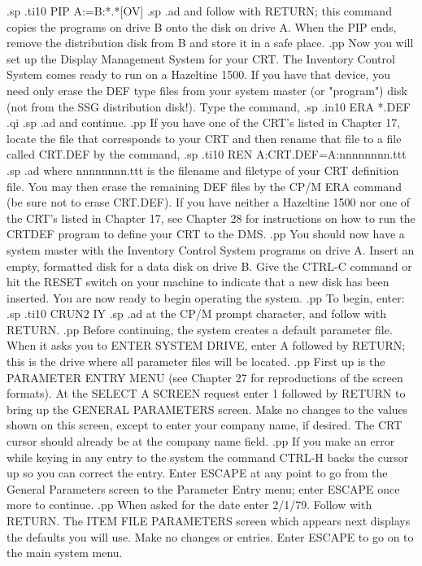 .sp
.ti10
PIP A:=B:*.*[OV]
.sp
.ad
and follow with RETURN; this command copies the programs on drive B onto
the disk on drive A.  When the PIP ends, remove the distribution disk
from B and store it in a safe place.
.pp
Now you will set up the Display Management System for your CRT. The
Inventory Control System comes ready to run on a Hazeltine 1500. If you
have that device, you need only erase the DEF type files from your system
master (or "program") disk (not from the SSG distribution disk!). Type
the command,
.sp
.in10
ERA *.DEF
.qi
.sp
.ad
and continue.
.pp
If you have one of the CRT's
listed in Chapter 17, locate the file that corresponds to your CRT and
then rename that file to a file called CRT.DEF by the command,
.sp
.ti10
REN A:CRT.DEF=A:nnnnnnnn.ttt
.sp
.ad
where nnnnnnnn.ttt is the filename and filetype of your CRT definition file.
You may then erase the remaining DEF files by the CP/M ERA command (be
sure not to erase CRT.DEF).  If you have neither a Hazeltine 1500 nor one of
the CRT's listed in Chapter 17, see Chapter 28 for instructions on how
to run the CRTDEF program to define your CRT to the DMS.
.pp
You should now have a system master with the Inventory Control System
programs on
drive A.  Insert an empty, formatted disk for a data disk on drive B.
Give the CTRL-C command or hit the RESET switch on your machine to indicate
that a new disk has been inserted.  You are now ready to begin operating
the system.
.pp
To begin, enter:
.sp
.ti10
CRUN2 IY
.sp
.ad
at the CP/M prompt character, and follow with RETURN.
.pp
Before continuing, the system creates a default parameter file.  When it
asks you to ENTER SYSTEM DRIVE, enter A followed by RETURN; this is the
drive where all parameter files will be located.
.pp
First up is the PARAMETER ENTRY MENU (see Chapter 27 for reproductions
of the screen formats).  At the SELECT A SCREEN request enter 1 followed
by RETURN to bring up the GENERAL PARAMETERS screen.  Make no changes
to the values shown on this screen, except to enter your company name, if
desired.  The CRT cursor should already be at the company name field.
.pp
If you make an error while keying in any entry to the system the command
CTRL-H backs the cursor up so you can correct the entry.  Enter ESCAPE
at any point to go from the General Parameters screen to the Parameter
Entry menu; enter ESCAPE once more to continue.
.pp
When asked for the date enter 2/1/79.  Follow with
RETURN.  The ITEM FILE PARAMETERS screen which appears next displays the
defaults you will use.	Make no changes or entries.  Enter ESCAPE to go
on to the main system menu.
